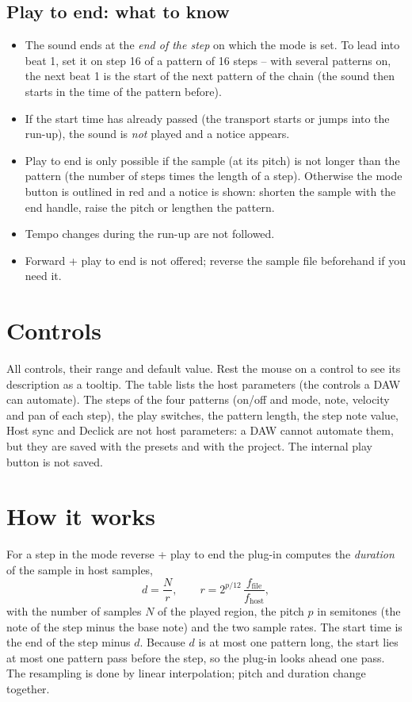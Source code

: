 \documentclass[12pt]{article}
\begin{document}
\subsection{Play to end: what to know}
\begin{itemize}
    \item The sound ends at the \emph{end of the step} on which the mode is set. To lead into beat 1, set it on step 16 of a pattern of 16 steps -- with several patterns on, the next beat 1 is the start of the next pattern of the chain (the sound then starts in the time of the pattern before).
    \item If the start time has already passed (the transport starts or jumps into the run-up), the sound is
    \emph{not} played and a notice appears.
    \item Play to end is only possible if the sample (at its pitch) is not longer than the pattern (the number of steps times the length of a step). Otherwise the mode button
    is outlined in red and a notice is shown: shorten the sample with the end handle, raise the pitch or lengthen the pattern.
    \item Tempo changes during the run-up are not followed.
    \item Forward + play to end is not offered; reverse the sample file beforehand if you need it.
\end{itemize}

\section{Controls}\label{sec:controls}
All controls, their range and default value. Rest the mouse on a control to see its
description as a tooltip. The table lists the host parameters (the controls a DAW can automate). The steps of the four patterns (on/off and
mode, note, velocity and pan of each step), the play switches, the pattern length, the step note value, Host sync and Declick are not host
parameters: a DAW cannot automate them, but they are saved with the presets and with the project. The internal play button is not saved.

\begin{center}
\small

\end{center}

\section{How it works}
For a step in the mode reverse + play to end the plug-in computes the \emph{duration} of the sample in host samples,
\[
  d = \frac{N}{r}, \qquad r = 2^{p/12}\,\frac{f_\mathrm{file}}{f_\mathrm{host}},
\]
with the number of samples $N$ of the played region, the pitch $p$ in semitones (the note of the step minus the base note) and the two sample rates. The start
time is the end of the step minus $d$. Because $d$ is at most one pattern long, the start lies at most one pattern pass before
the step, so the plug-in looks ahead one pass. The resampling is done by linear interpolation; pitch and duration change together.
\end{document}

